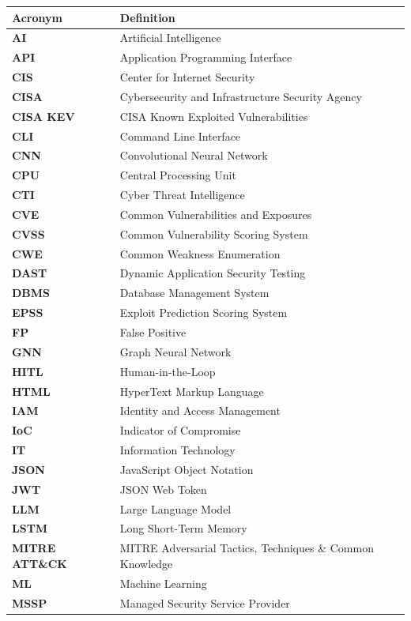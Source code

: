 \documentclass[12pt,a4paper]{report}
\begin{document}
\begin{longtable}{>{\bfseries}p{3.5cm} p{10.5cm}}
\toprule
\textbf{Acronym} & \textbf{Definition} \\
\midrule
\endhead
AI          & Artificial Intelligence \\
API         & Application Programming Interface \\
CIS         & Center for Internet Security \\
CISA        & Cybersecurity and Infrastructure Security Agency \\
CISA KEV    & CISA Known Exploited Vulnerabilities \\
CLI         & Command Line Interface \\
CNN         & Convolutional Neural Network \\
CPU         & Central Processing Unit \\
CTI         & Cyber Threat Intelligence \\
CVE         & Common Vulnerabilities and Exposures \\
CVSS        & Common Vulnerability Scoring System \\
CWE         & Common Weakness Enumeration \\
DAST        & Dynamic Application Security Testing \\
DBMS        & Database Management System \\
EPSS        & Exploit Prediction Scoring System \\
FP          & False Positive \\
GNN         & Graph Neural Network \\
HITL        & Human-in-the-Loop \\
HTML        & HyperText Markup Language \\
IAM         & Identity and Access Management \\
IoC         & Indicator of Compromise \\
IT          & Information Technology \\
JSON        & JavaScript Object Notation \\
JWT         & JSON Web Token \\
LLM         & Large Language Model \\
LSTM        & Long Short-Term Memory \\
MITRE ATT\&CK & MITRE Adversarial Tactics, Techniques \& Common Knowledge \\
ML          & Machine Learning \\
MSSP        & Managed Security Service Provider \\

\end{longtable}
\end{document}
